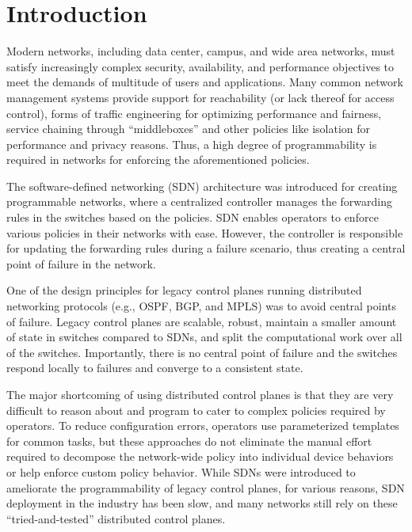 \section{Introduction}
Modern networks, including data center, campus, 
and wide area networks, 
must satisfy increasingly complex security, 
availability, and performance objectives to 
meet the demands of multitude of users and applications. 
Many common network management systems provide support
for reachability (or lack thereof for access control),
forms of traffic engineering for optimizing performance
and fairness, service chaining through ``middleboxes'' and
other policies like isolation for performance and privacy reasons.
Thus, a high degree of programmability is required in networks
for enforcing the aforementioned policies.

The software-defined networking (SDN) architecture was introduced
for creating programmable networks, where a centralized controller
manages the forwarding rules in the switches based on the policies.
SDN enables operators to enforce various policies in their networks 
with ease. 
However, the controller is responsible for updating the forwarding
rules during a failure scenario, thus creating a central point of 
failure in the network. 

One of the design principles
for legacy control planes running distributed networking protocols 
(e.g., OSPF, BGP, and MPLS) was to avoid central points of failure.
Legacy control planes are scalable, robust, maintain a smaller amount 
of state in switches compared to SDNs, 
and split the computational work over all of the switches. 
Importantly, there is no central point of failure and the switches
respond locally to failures and converge to a consistent state. 

The major shortcoming of using distributed control planes is that
they are very difficult to reason about and program to cater to 
complex policies required by operators. To reduce configuration 
errors, operators use parameterized templates for common
tasks, but these approaches do not eliminate the manual effort
required to decompose the network-wide policy into individual device
behaviors or help enforce custom policy behavior. While SDNs 
were introduced to ameliorate the programmability of legacy control planes, 
for various reasons, 
SDN deployment in the industry has been slow, and many 
networks still rely on these ``tried-and-tested'' distributed 
control planes. 

% 


